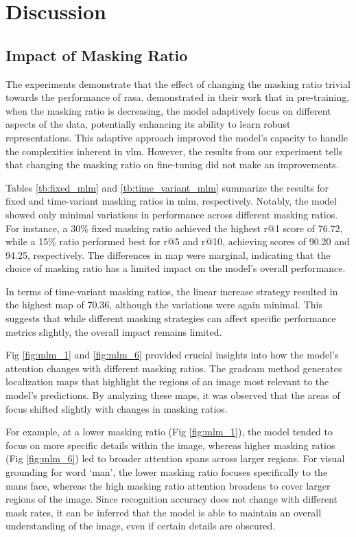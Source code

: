 \section{Discussion}
\subsection{Impact of Masking Ratio}

The experiments demonstrate that the effect of changing the masking ratio trivial towards the performance of \acrshort{rasa}. \cite{yang2023learningbettermaskingbetter} demonstrated in their work that in pre-training, when the masking ratio is decreasing, the model adaptively focus on different aspects of the data, potentially enhancing its ability to learn robust representations. This adaptive approach improved the model's capacity to handle the complexities inherent in \acrshort{vlm}. However, the results from our experiment tells that changing the masking ratio on fine-tuning did not make an improvements. 

Tables \ref{tb:fixed_mlm} and \ref{tb:time_variant_mlm} summarize the results for fixed and time-variant masking ratios in \acrshort{mlm}, respectively. Notably, the model showed only minimal variations in performance across different masking ratios. For instance, a 30\% fixed masking ratio achieved the highest r@1 score of 76.72, while a 15\% ratio performed best for r@5 and r@10, achieving scores of 90.20 and 94.25, respectively. The differences in \acrshort{map} were marginal, indicating that the choice of masking ratio has a limited impact on the model's overall performance.

In terms of time-variant masking ratios, the linear increase strategy resulted in the highest \acrshort{map} of 70.36, although the variations were again minimal. This suggests that while different masking strategies can affect specific performance metrics slightly, the overall impact remains limited.

Fig \ref{fig:mlm_1} and \ref{fig:mlm_6} provided crucial insights into how the model's attention changes with different masking ratios. The \acrshort{gradcam} method generates localization maps that highlight the regions of an image most relevant to the model's predictions. By analyzing these maps, it was observed that the areas of focus shifted slightly with changes in masking ratios.

For example, at a lower masking ratio (Fig \ref{fig:mlm_1}), the model tended to focus on more specific details within the image, whereas higher masking ratios (Fig \ref{fig:mlm_6}) led to broader attention spans across larger regions. For visual grounding for word `man', the lower masking ratio focuses specifically to the mans face, whereas the high masking ratio attention broadens to cover larger regions of the image. Since recognition accuracy does not change with different mask rates, it can be inferred that the model is able to maintain an overall understanding of the image, even if certain details are obscured.  


